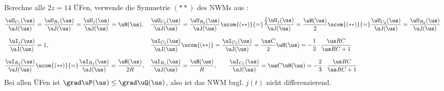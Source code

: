 Berechne alle $2z=14$ ÜFen, verwende die Symmetrie $(**)$ des NWMs aus :
\begin{align*}%
	\frac{\uU_{C_1}(\us)}{\uJ(\us)}&=\frac{\uU_{R_1}(\us)}{\uJ(\us)}=\frac{\uU_{j}(\us)}{\uJ(\us)}=\uH(\us),&\frac{\uU_{C_3}(\us)}{\uJ(\us)}&=\frac{\uU_{R_3}(\us)}{\uJ(\us)}\ucom{(**)}{=}\frac{\frac{1}{2}\uU_{j}(\us)}{\uJ(\us)}=\frac{\uH(\us)}{2}\ucom{(**)}{=}\frac{\uU_{C_2}(\us)}{\uJ(\us)}=\frac{\uU_{R_2}(\us)}{\uJ(\us)}\\[2.5mm]%
%
	\frac{\uI_j(\us)}{\uJ(\us)}&=1,&\frac{\uI_{C_3}(\us)}{\uJ(\us)}&\ucom{(**)}=\frac{\uI_{C_2}(\us)}{\uJ(\us)}=\frac{\us C}{2}\uH(\us)=-\frac{1}{3}\cdot\frac{\us RC}{\us RC+1}\\[2.5mm]%
%
	\frac{\uI_{R_2}(\us)}{\uJ(\us)}&\ucom{(**)}{=}\frac{\uI_{R_3}(\us)}{\uJ(\us)}=\frac{\uH(\us)}{2R},&\frac{\uI_{R_1}(\us)}{\uJ(\us)}&=\frac{\uH(\us)}{R},\qquad \frac{\uI_{C_1}(\us)}{\uJ(\us)}=\us C\uH(\us)=-\frac{2}{3}\cdot\frac{\us RC}{\us RC+1}%
\end{align*}%
%
Bei allen ÜFen ist $\grad\uP(\us)\leq\grad\uQ(\us)$, also ist das NWM bzgl. $j(t)$ nicht differenzierend.


